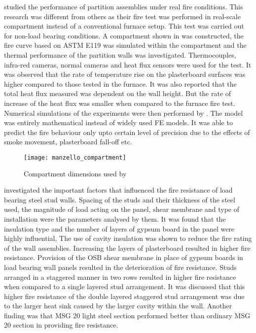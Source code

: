 \citet{Manzello2005} studied the performance of partition assemblies under real fire conditions. This research was different from others as their fire test was performed in real-scale compartment instead of a conventional furnace setup. This test was carried out for non-load bearing conditions. A compartment shown in  was constructed, the fire curve based on ASTM E119 was simulated within the compartment and the thermal performance of the partition walls was investigated. Thermocouples, infra-red cameras, normal cameras and heat flux sensors were used for the test. It was observed that the rate of temperature rise on the plasterboard surfaces was higher compared to those tested in the furnace. It was also reported that the total heat flux measured was dependent on the wall height. But the rate of increase of the heat flux was smaller when compared to the furnace fire test. Numerical simulations of the experiments were then performed by \citet{Manzello2007}. The model was entirely mathematical instead of widely used FE models. It was able to predict the fire behaviour only upto certain level of precision due to the effects of smoke movement, plasterboard fall-off etc.
\begin{figure}[htbp]
	\centering
		\texttt{[image: manzello\_compartment]}		
		\caption{Compartment dimensions used by \citet{Manzello2005}}
			\label{fig:manzello_compartment}
	\end{figure}

\citet{Kodur2006} investigated the important factors that influenced the fire resistance of load bearing steel stud walls. Spacing of the studs and their thickness of the steel used, the magnitude of load acting on the panel, shear membrane and type of installation were the parameters analysed by them. It was found that the insulation type and the number of layers of gypsum board in the panel were highly influential, The use of cavity insulation was shown to reduce the fire rating of the wall assemblies. Increasing the layers of plasterboard resulted in higher fire resistance. Provision of the OSB shear membrane in place of gypsum boards in load bearing wall panels resulted in the deterioration of fire resistance. Studs arranged in a staggered manner in two rows resulted in higher fire resistance when compared to a single layered stud arrangement. It was discussed that this higher fire resistance of the double layered staggered stud arrangement was due to the larger heat sink caused by the larger cavity within the wall. Another finding was that MSG 20 light steel section performed better than ordinary MSG 20 section in providing fire resistance.


